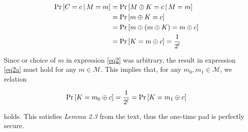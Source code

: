 \documentclass[../midterm.tex]{subfiles}
\begin{document}
\begin{flushleft}
\begin{align}
\Pr \left[ C = c \, \vert \, M = m \right] &= \Pr \left[ M \oplus K = c \, \vert \, M = m \right] \notag \\
&= \Pr \left[ m \oplus K = c \right] \notag \\
&= \Pr \left[ m \oplus \left( m \oplus K \right) = m \oplus c \right] \notag \\
&= \Pr \left[ K = m \oplus c \right] = \frac{1}{2^l} \label{eq2a}
\end{align}

Since or choice of $m$ in expression \ref{eq2} was arbitrary, the result in expression \ref{eq2a} must hold for any $m \in \mathcal{M}$.  This implies that, for any $m_0, m_1 \in \mathcal{M}$, we relation

\begin{align}
\Pr \left[ K = m_0 \oplus c \right] = \frac{1}{2^l} = \Pr \left[ K = m_1 \oplus c \right] \notag
\end{align}

holds.  This satisfies \emph{Lemma 2.3} from the text, thus the one-time pad is perfectly secure. \newline




\end{flushleft}
\end{document}
